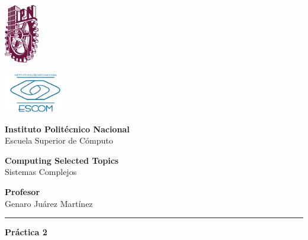 \documentclass[10pt]{article}
\newcommand{\HRule}{\textcolor{blueTitle}{\rule{\linewidth}{0.5mm}}}
\begin{document}
    \thispagestyle{empty}

    \begin{center}
        \begin{minipage}{0.48\textwidth}
            \begin{flushleft}
                \hspace{1cm}\includegraphics[width=1.5cm]{ipn.png}
            \end{flushleft}
        \end{minipage}
        \begin{minipage} {0.48\textwidth}
            \begin{flushright}
                \includegraphics[width=2.7cm]{escom.png}
            \end{flushright}
        \end{minipage}

        \vspace*{-2cm}

        \LARGE
        \textcolor{blueTitle}{\textbf{Instituto Politécnico Nacional\\}}
        \LARGE
        \textcolor{blueTitle}{Escuela Superior de Cómputo}

        \vspace{2cm}
        
        \Large
        \textbf{Computing Selected Topics} \\
        \vspace{.3cm}
        Sistemas Complejos
        \vspace{1.5cm}
        
        \Large
        \textbf{Profesor} \\
        \vspace{.3cm}
        Genaro Juárez Martínez
        \vspace{1cm}
        
        \HRule
        \vspace{.4cm}
        {\textbf{Práctica 2} \smallskip
        
}
\end{center}
\end{document}
